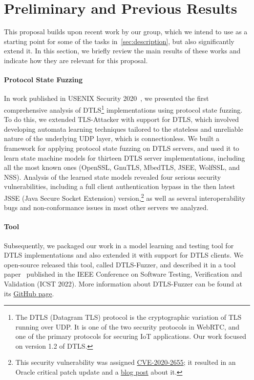 \documentclass[11pt]{article}
\newcommand{\system}[1]{\mbox{\textsf{#1}}}
\newcommand{\myparagraph}{}
\let\myparagraph=\paragraph
\renewcommand{\paragraph}{\vspace{-3mm}\myparagraph}
\begin{document}
\section{Preliminary and Previous Results} \label{sec:prelim}
This proposal builds upon recent work by our group, which we intend to use as
a starting point for some of the tasks in~\cref{sec:description}, but also
significantly extend it.  In this section, we briefly review the main results
of these works and indicate how they are relevant for this proposal.

\paragraph{Protocol State Fuzzing}
In work published in USENIX Security 2020~\cite{DTLS@USENIX-20}, we presented
the first comprehensive analysis of DTLS\footnote{The DTLS (Datagram TLS)
protocol is the cryptographic variation of TLS running over UDP. It is one of
the two security protocols in WebRTC, and one of the primary protocols for
securing IoT applications. Our work focused on version 1.2 of DTLS.}
implementations using protocol state fuzzing. To do this, we extended
\system{TLS-Attacker} with support for DTLS, which involved developing
automata learning techniques tailored to the stateless and unreliable nature
of the underlying UDP layer, which is connectionless. We built a framework for
applying protocol state fuzzing on DTLS servers, and used it to learn state
machine models for thirteen DTLS server implementations, including all the
most known ones (OpenSSL, GnuTLS, MbedTLS, JSEE, WolfSSL, and NSS).
%
Analysis of the learned state models revealed four serious security
vulnerabilities, including a full client authentication bypass in the then
latest JSSE (Java Secure Socket Extension) version,\footnote{This security
vulnerability was assigned
\href{https://nvd.nist.gov/vuln/detail/CVE-2020-2655}{CVE-2020-2655}; it
resulted in an Oracle critical patch update and a
\href{https://web-in-security.blogspot.com/2020/01/cve-2020-2655-jsse-client.html}{blog
  post} about it.} as well as several interoperability bugs and
non-conformance issues in most other servers we analyzed.

\paragraph{Tool}
Subsequently, we packaged our work in a model learning and testing tool for
DTLS implementations and also extended it with support for DTLS clients. We
open-source released this tool, called \system{DTLS-Fuzzer}, and described it
in a tool paper~\cite{DTLS-Fuzzer@ICST-22} published in the IEEE Conference on
Software Testing, Verification and Validation (ICST 2022).
%
More information about \system{DTLS-Fuzzer} can be found at its
\href{https://github.com/assist-project/dtls-fuzzer/}{GitHub page}.
\end{document}
